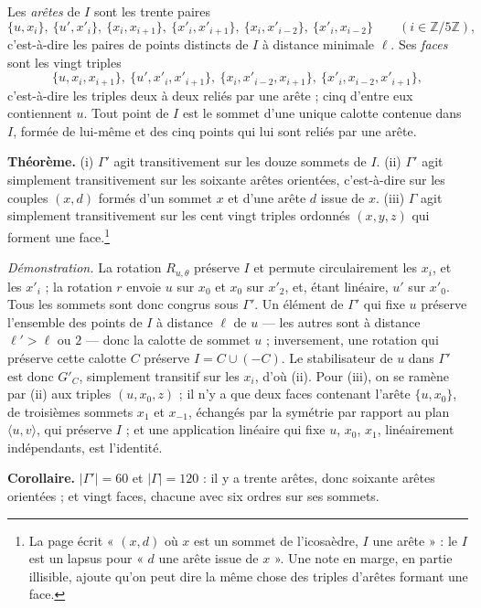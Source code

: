\documentclass[11pt,a4paper]{article}
\begin{document}
Les \emph{arêtes} de $I$ sont les trente paires
\[
\{u, x_i\},\ \{u', x'_i\},\ \{x_i, x_{i+1}\},\ \{x'_i, x'_{i+1}\},\ \{x_i, x'_{i-2}\},\ \{x'_i, x_{i-2}\}\qquad (i \in \mathbb{Z}/5\mathbb{Z}),
\]
c'est-à-dire les paires de points distincts de $I$ à distance minimale
$\ell$. Ses \emph{faces} sont les vingt triples
\[
\{u, x_i, x_{i+1}\},\ \{u', x'_i, x'_{i+1}\},\ \{x_i, x'_{i-2}, x_{i+1}\},\ \{x'_i, x_{i-2}, x'_{i+1}\},
\]
c'est-à-dire les triples deux à deux reliés par une arête ; cinq d'entre eux
contiennent $u$. Tout point de $I$ est le sommet d'une unique calotte contenue
dans $I$, formée de lui-même et des cinq points qui lui sont reliés par une
arête.

\textbf{Théorème.} (i) $\Gamma'$ agit transitivement sur les douze sommets de
$I$. (ii) $\Gamma'$ agit simplement transitivement sur les soixante arêtes
orientées, c'est-à-dire sur les couples $(x, d)$ formés d'un sommet $x$ et
d'une arête $d$ issue de $x$. (iii) $\Gamma$ agit simplement transitivement
sur les cent vingt triples ordonnés $(x, y, z)$ qui forment une
face.\footnote{La page écrit « $(x,d)$ où $x$ est un sommet de l'icosaèdre,
$I$ une arête » : le $I$ est un lapsus pour « $d$ une arête issue de $x$ ».
Une note en marge, en partie illisible, ajoute qu'on peut dire la même chose
des triples d'arêtes formant une face.}

\emph{Démonstration.} La rotation $R_{u,\theta}$ préserve $I$ et permute
circulairement les $x_i$, et les $x'_i$ ; la rotation $r$ envoie $u$ sur
$x_0$ et $x_0$ sur $x'_2$, et, étant linéaire, $u'$ sur $x'_0$. Tous les
sommets sont donc congrus sous $\Gamma'$. Un élément de $\Gamma'$ qui fixe $u$
préserve l'ensemble des points de $I$ à distance $\ell$ de $u$ --- les autres
sont à distance $\ell' > \ell$ ou $2$ --- donc la calotte de sommet $u$ ;
inversement, une rotation qui préserve cette calotte $C$ préserve
$I = C \cup (-C)$. Le stabilisateur de $u$ dans $\Gamma'$ est donc $G'_C$,
simplement transitif sur les $x_i$, d'où (ii). Pour (iii), on se ramène par
(ii) aux triples $(u, x_0, z)$ ; il n'y a que deux faces contenant l'arête
$\{u, x_0\}$, de troisièmes sommets $x_1$ et $x_{-1}$, échangés par la
symétrie par rapport au plan $\langle u, v \rangle$, qui préserve $I$ ; et
une application linéaire qui fixe $u$, $x_0$, $x_1$, linéairement
indépendants, est l'identité.

\textbf{Corollaire.} $|\Gamma'| = 60$ et $|\Gamma| = 120$ : il y a trente
arêtes, donc soixante arêtes orientées ; et vingt faces, chacune avec six
ordres sur ses sommets.
\end{document}
